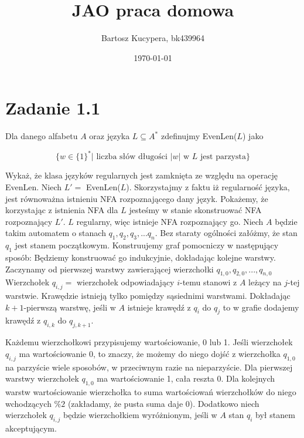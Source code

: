 \documentclass{article}
\title{JAO praca domowa}
\author{Bartosz Kucypera, bk439964}
\date{\today}
\begin{document}
\maketitle

\section*{Zadanie 1.1}

Dla danego alfabetu $A$ oraz języka $L \subseteq A^*$ zdefinujmy EvenLen($L$) jako 

$$\{w \in \{1\}^* |\mbox{ liczba słów długości $|w|$ w $L$ jest parzysta} \}$$

Wykaż, że klasa języków regularnych jest zamknięta ze względu na operację EvenLen. \newline
\newline 
Niech $L' = $ EvenLen($L$).
Skorzystajmy z faktu iż regularność języka, jest równoważna istnieniu NFA rozpoznającego dany język. Pokażemy, że korzystając z istnienia NFA dla $L$ jesteśmy w stanie skonstruować NFA rozpoznający $L'$. \newline 
\newline 
$L$ regularny, więc istnieje NFA rozpoznający go. Niech $A$ będzie takim automatem o stanach $q_1, q_2, q_3, ... q_n$. Bez staraty ogólności załóżmy, że stan $q_1$ jest stanem początkowym. Konstruujemy graf pomocniczy w następujący sposób: \newline
Będziemy konstruować go indukcyjnie, dokładając kolejne warstwy.
Zaczynamy od pierwszej warstwy zawierającej wierzchołki $q_{1,0}, q_{2,0}, ..., q_{n,0}$
Wierzchołek $q_{i,j} = $ wierzchołek odpowiadający $i$-temu stanowi z $A$ leżący na $j$-tej warstwie. \newline 
Krawędzie istnieją tylko pomiędzy sąsiednimi warstwami. Dokładając $k+1$-pierwszą warstwę, jeśli w $A$ istnieje krawędź z $q_i$ do $q_j$ to w grafie dodajemy krawędź z $q_{i,k}$ do $q_{j,k+1}$.

Każdemu wierzchołkowi przypisujemy wartościowanie, 0 lub 1. Jeśli wierzchołek $q_{i, j}$ ma wartościowanie 0, to znaczy, że możemy do niego dojść z wierzchołka $q_{1, 0}$ na parzyście wiele sposobów, w przeciwnym razie na nieparzyście. \newline
Dla pierwszej warstwy wierzchołek $q_{1,0}$ ma wartościowanie 1, cała reszta 0. Dla kolejnych warstw wartościowanie wierzchołka to suma wartościowań wierzchołków do niego wchodzących $\%2$ (zakładamy, że pusta suma daje 0). \newline
Dodatkowo niech wierzchołek $q_{i,j}$ będzie wierzchołkiem wyróżnionym, jeśli w $A$ stan $q_i$ był stanem akceptującym. \newline \newline
\end{document}
